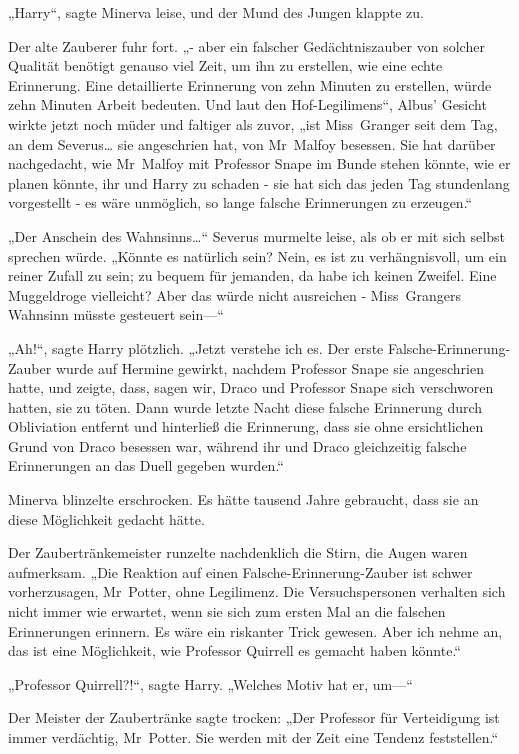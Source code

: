 {„Harry“, sagte Minerva leise, und der Mund des Jungen klappte zu.

Der alte Zauberer fuhr fort. „- aber ein falscher Gedächtniszauber von solcher Qualität benötigt genauso viel Zeit, um ihn zu erstellen, wie eine echte Erinnerung. Eine detaillierte Erinnerung von zehn Minuten zu erstellen, würde zehn Minuten Arbeit bedeuten. Und laut den Hof-Legilimens“, Albus' Gesicht wirkte jetzt noch müder und faltiger als zuvor, „ist Miss~Granger seit dem Tag, an dem Severus… sie angeschrien hat, von Mr~Malfoy besessen. Sie hat darüber nachgedacht, wie Mr~Malfoy mit Professor Snape im Bunde stehen könnte, wie er planen könnte, ihr und Harry zu schaden - sie hat sich das jeden Tag stundenlang vorgestellt - es wäre unmöglich, so lange falsche Erinnerungen zu erzeugen.“

„Der Anschein des Wahnsinns…“ Severus murmelte leise, als ob er mit sich selbst sprechen würde. „Könnte es natürlich sein? Nein, es ist zu verhängnisvoll, um ein reiner Zufall zu sein; zu bequem für jemanden, da habe ich keinen Zweifel. Eine Muggeldroge vielleicht? Aber das würde nicht ausreichen - Miss~Grangers Wahnsinn müsste gesteuert sein—“

„Ah!“, sagte Harry plötzlich. „Jetzt verstehe ich es. Der erste Falsche-Erinnerung-Zauber wurde auf Hermine gewirkt, nachdem Professor Snape sie angeschrien hatte, und zeigte, dass, sagen wir, Draco und Professor Snape sich verschworen hatten, sie zu töten. Dann wurde letzte Nacht diese falsche Erinnerung durch Obliviation entfernt und hinterließ die Erinnerung, dass sie ohne ersichtlichen Grund von Draco besessen war, während ihr und Draco gleichzeitig falsche Erinnerungen an das Duell gegeben wurden.“

Minerva blinzelte erschrocken. Es hätte tausend Jahre gebraucht, dass sie an diese Möglichkeit gedacht hätte.

Der Zaubertränkemeister runzelte nachdenklich die Stirn, die Augen waren aufmerksam. „Die Reaktion auf einen Falsche-Erinnerung-Zauber ist schwer vorherzusagen, Mr~Potter, ohne Legilimenz. Die Versuchspersonen verhalten sich nicht immer wie erwartet, wenn sie sich zum ersten Mal an die falschen Erinnerungen erinnern. Es wäre ein riskanter Trick gewesen. Aber ich nehme an, das ist eine Möglichkeit, wie Professor Quirrell es gemacht haben könnte.“

„Professor Quirrell?!“, sagte Harry. „Welches Motiv hat er, um—“

Der Meister der Zaubertränke sagte trocken: „Der Professor für Verteidigung ist immer verdächtig, Mr~Potter. Sie werden mit der Zeit eine Tendenz feststellen.“

}
